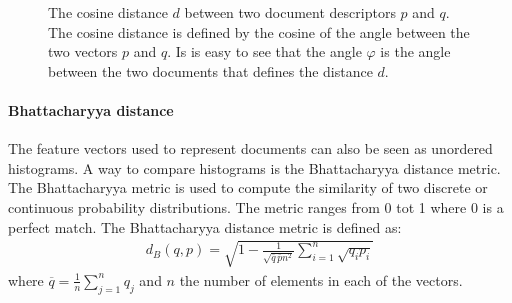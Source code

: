\begin{figure}[h!]
 \center

 \caption{The cosine distance $d$ between two document descriptors $p$ and $q$. The cosine distance is defined by the cosine of the angle between the two vectors $p$ and $q$. Is is easy to see that the angle $\varphi$ is the angle between the two documents that defines the distance $d$.}
 \label{fig:cosine}
\end{figure}

\paragraph{Bhattacharyya distance} The feature vectors used to represent documents can
also be seen as unordered histograms. A way to compare histograms is the
Bhattacharyya distance metric. The Bhattacharyya metric is used to compute
the similarity of two discrete or continuous probability distributions. The 
metric ranges from 0 tot 1 where 0 is a perfect match. The Bhattacharyya 
distance metric is defined as:
\begin{align}
  d_B (q,p) = \sqrt{1 - \frac{1}{\sqrt{\overline{q}\,\overline{p}n^2}}\sum_{i=1}^n \sqrt{q_ip_i}}
\end{align}
where $\overline{q} = \frac{1}{n}\sum_{j=1}^n q_j$ and $n$ the number of
elements in each of the vectors.

